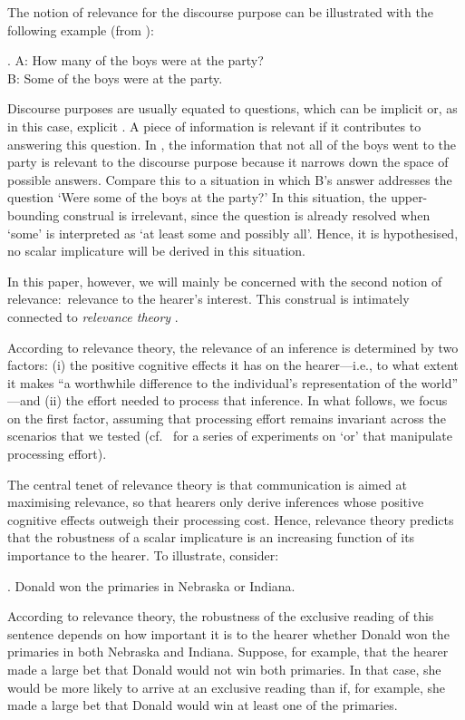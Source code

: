 \documentclass[12pt]{article}
\begin{document}
The notion of relevance for the discourse purpose can be illustrated with the following example (from \citealt{kuppevelt1996}):

\ex.	A: How many of the boys were at the party? \\ B: Some of the boys were at the party.

Discourse purposes are usually equated to questions, which can be implicit or, as in this case, explicit \citep{roberts2012}. A piece of information is relevant if it contributes to answering this question. In \Last, the information that not all of the boys went to the party is relevant to the discourse purpose because it narrows down the space of possible answers. Compare this to a situation in which B's answer addresses the question `Were some of the boys at the party?' In this situation, the upper-bounding construal is irrelevant, since the question is already resolved when `some' is interpreted as `at least some and possibly all'. Hence, it is hypothesised, no scalar implicature will be derived in this situation.

In this paper, however, we will mainly be concerned with the second notion of relevance:\ relevance to the hearer's interest. This construal is intimately connected to \emph{relevance theory} \citep{sperber1995}.

According to relevance theory, the relevance of an inference is determined by two factors: (i) the positive cognitive effects it has on the hearer---i.e., to what extent it makes ``a worthwhile difference to the individual's representation of the world'' \citep[p.\ 251]{wilson2002}---and (ii) the effort needed to process that inference. In what follows, we focus on the first factor, assuming that processing effort remains invariant across the scenarios that we tested (cf.\ \citealt{chevallier2008} for a series of experiments on `or' that manipulate processing effort). 

The central tenet of relevance theory is that communication is aimed at maximising relevance, so that hearers only derive inferences whose positive cognitive effects outweigh their processing cost. Hence, relevance theory predicts that the robustness of a scalar implicature is an increasing function of its importance to the hearer. To illustrate, consider:

\ex.	Donald won the primaries in Nebraska or Indiana.

According to relevance theory, the robustness of the exclusive reading of this sentence depends on how important it is to the hearer whether Donald won the primaries in both Nebraska and Indiana. Suppose, for example, that the hearer made a large bet that Donald would not win both primaries. In that case, she would be more likely to arrive at an exclusive reading than if, for example, she made a large bet that Donald would win at least one of the primaries.
\end{document}
